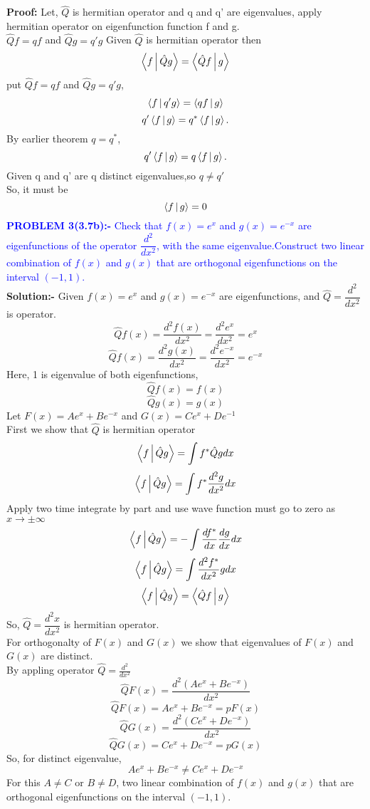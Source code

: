 \textbf{Proof:} Let, $\hat{Q}$ is hermitian operator and q and q' are eigenvalues, apply hermitian operator on eigenfunction function f and g.\\
$\hat{Q}f=qf$  and  $\hat{Q}g=q'g$
Given $\hat{Q}$ is hermitian operator then $$\Braket{f|\hat{Q}g}=\Braket{\hat{Q}f|g}$$
put $\hat{Q}f=qf$ and $\hat{Q}g=q'g$,\\
$$\Braket{f|q'g}=\Braket{qf|g}$$
$$q'\Braket{f|g}=q^{*}\Braket{f|g}.$$
By earlier theorem $q=q^{*}$,$$q'\Braket{f|g}=q\Braket{f|g}.$$
Given q and q' are q distinct eigenvalues,so $q\neq{q'}$\\
So, it must be $$\Braket{f|g}=0$$
\newpage
\textcolor{blue}{ \textbf{PROBLEM 3(3.7b):-} Check that $f(x)=e^{x}$ and $g(x)=e^{-x}$ are eigenfunctions of the operator $\dfrac{d^2}{dx^2}$, with the same eigenvalue.Construct two linear combination of $ f(x) $ and $ g(x) $ that are orthogonal eigenfunctions on the interval $ (-1,1) $.}\\
\textbf{Solution:-} Given $f(x)=e^x$ and $g(x)=e^{-x}$ are eigenfunctions, and $\hat{Q}=\dfrac{d^2}{dx^2}$  is operator.\\
$$\hat{Q}f(x)=\frac{d^2f(x)}{dx^2}=\frac{d^2{e^{x}}}{dx^2}=e^{x}$$
$$\hat{Q}f(x)=\frac{d^2g(x)}{dx^2}=\frac{d^2{e^{-x}}}{dx^2}=e^{-x}$$
Here, 1 is eigenvalue of both eigenfunctions,\\
$$\hat{Q}f(x)=f(x)$$
$$\hat{Q}g(x)=g(x)$$
Let $F(x)=Ae^x+Be^{-x}$ and $G(x)=Ce^x+De^{-1}$\\
First we show that $\hat{Q}$ is hermitian operator\\
$$\Braket{f|\hat{Q}g}=\int{f^{*}\hat{Q}gdx}$$
$$\Braket{f|\hat{Q}g}=\int{f^{*}\frac{d^2{g}}{dx^2}dx}$$
Apply  two time integrate by part and use wave function must go to zero as $x\rightarrow{\pm\infty}$
$$\Braket{f|\hat{Q}g}=-\int{\frac{df^{*}}{dx}\frac{d{g}}{dx}dx}$$
$$\Braket{f|\hat{Q}g}=\int{\frac{d^2{f^{*}}}{dx^2}{g}dx}$$
$$\Braket{f|\hat{Q}g}=\Braket{\hat{Q}f|g}$$
So, $\hat{Q}=\dfrac{d^2x}{dx^2}$ is hermitian operator.\\
For orthogonalty of $F(x)$ and $G(x)$ we show that  eigenvalues of $F(x)$ and $G(x)$ are distinct.\\
By appling operator $\hat{Q}=\frac{d^2}{dx^2}$\\
$$\hat{Q}F(x)=\frac{d^2(Ae^x+Be^{-x})}{dx^2}$$
$$\hat{Q}F(x)=Ae^x+Be^{-x}=pF(x)$$
$$\hat{Q}G(x)=\frac{d^2(Ce^x+De^{-x})}{dx^2}$$
$$\hat{Q}G(x)=Ce^x+De^{-x}=pG(x)$$ 
So, for distinct eigenvalue,$$Ae^x+Be^{-x}\neq Ce^x+De^{-x}$$
For this $A\neq C$ or  $B\neq D$, two linear combination of $ f(x) $ and $ g(x) $ that are orthogonal eigenfunctions on the interval $ (-1,1) $.\\
